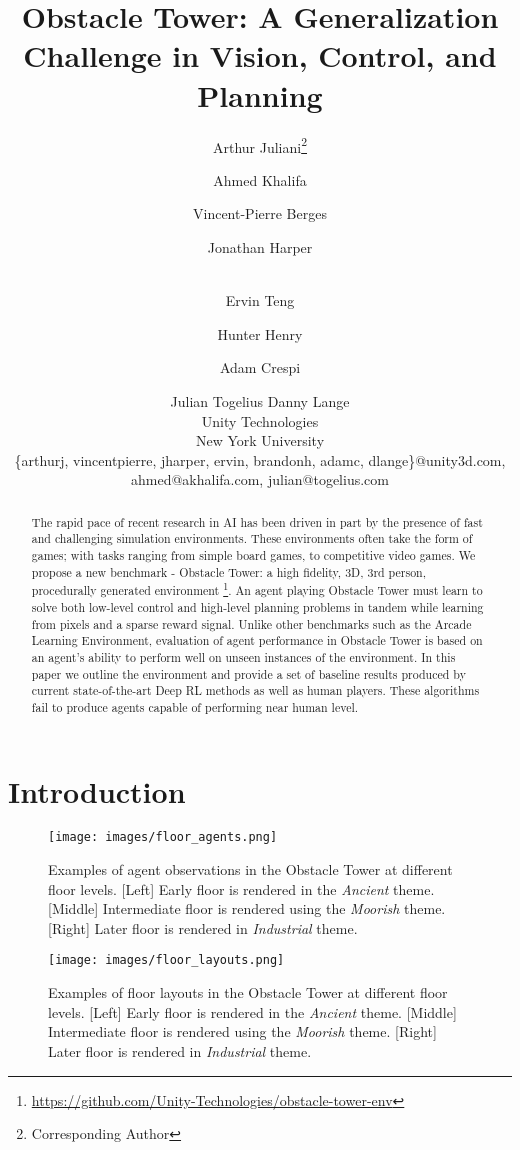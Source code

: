 \documentclass{article}
\title{Obstacle Tower: A Generalization Challenge in Vision, Control, and Planning}
\author{
Arthur Juliani\footnote{Corresponding Author}\and
Ahmed Khalifa\and
Vincent-Pierre Berges\and
Jonathan Harper\and\\
Ervin Teng\and
Hunter Henry\and
Adam Crespi\and
Julian Togelius\And
Danny Lange\\
\affiliations
Unity Technologies\\
New York University\\
\emails
\{arthurj, vincentpierre, jharper, ervin, brandonh, adamc, dlange\}@unity3d.com,
\\
ahmed@akhalifa.com, 
julian@togelius.com
}
\begin{document}
\maketitle

\begin{abstract}
The rapid pace of recent research in AI has been driven in part by the presence of fast and challenging simulation environments. These environments often take the form of games; with tasks ranging from simple board games, to competitive video games. We propose a new benchmark - Obstacle Tower: a high fidelity, 3D, 3rd person, procedurally generated environment \footnote{\url{https://github.com/Unity-Technologies/obstacle-tower-env}}. An agent playing Obstacle Tower must learn to solve both low-level control and high-level planning problems in tandem while learning from pixels and a sparse reward signal. Unlike other benchmarks such as the Arcade Learning Environment, evaluation of agent performance in Obstacle Tower is based on an agent's ability to perform well on unseen instances of the environment. In this paper we outline the environment and provide a set of baseline results produced by current state-of-the-art Deep RL methods as well as human players. These algorithms fail to produce agents capable of performing near human level.
\end{abstract}
\section{Introduction}


\begin{figure*}[!t]
    \centering
    \texttt{[image: images/floor\_agents.png]}
    \caption{Examples of agent observations in the Obstacle Tower at different floor levels. [Left] Early floor is rendered in the \emph{Ancient} theme. [Middle] Intermediate floor is rendered using the \emph{Moorish} theme. [Right] Later floor is rendered in \emph{Industrial} theme.}
    \label{fig:visualExampleAgent}
\end{figure*}

\begin{figure*}[!t]
    \centering
    \texttt{[image: images/floor\_layouts.png]}
    \caption{Examples of floor layouts in the Obstacle Tower at different floor levels. [Left] Early floor is rendered in the \emph{Ancient} theme. [Middle] Intermediate floor is rendered using the \emph{Moorish} theme. [Right] Later floor is rendered in \emph{Industrial} theme.}
    \label{fig:visualExampleFloors}
\end{figure*}
\end{document}

